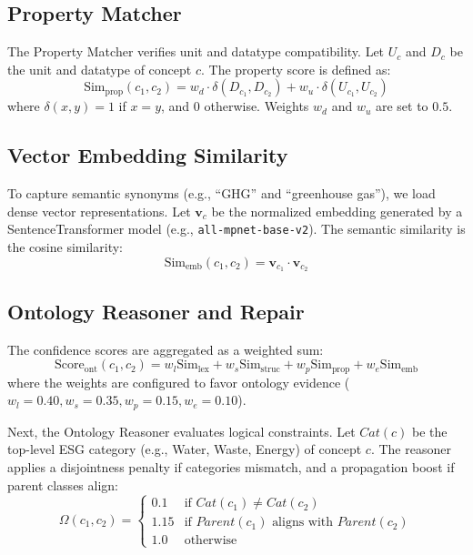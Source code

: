 \documentclass[journal,compsoc]{IEEEtran}
\begin{document}
\begin{itemize}
\subsection{Property Matcher}
The Property Matcher verifies unit and datatype compatibility. Let $U_c$ and $D_c$ be the unit and datatype of concept $c$. The property score is defined as:
\begin{equation}
\text{Sim}_{\text{prop}}(c_1, c_2) = w_d \cdot \delta(D_{c_1}, D_{c_2}) + w_u \cdot \delta(U_{c_1}, U_{c_2})
\end{equation}
where $\delta(x, y) = 1$ if $x = y$, and $0$ otherwise. Weights $w_d$ and $w_u$ are set to $0.5$.

\subsection{Vector Embedding Similarity}
To capture semantic synonyms (e.g., ``GHG'' and ``greenhouse gas''), we load dense vector representations. Let $\mathbf{v}_{c}$ be the normalized embedding generated by a SentenceTransformer model (e.g., \texttt{all-mpnet-base-v2}). The semantic similarity is the cosine similarity:
\begin{equation}
\text{Sim}_{\text{emb}}(c_1, c_2) = \mathbf{v}_{c_1} \cdot \mathbf{v}_{c_2}
\end{equation}

\subsection{Ontology Reasoner and Repair}
The confidence scores are aggregated as a weighted sum:
\begin{equation}
\text{Score}_{\text{ont}}(c_1, c_2) = w_{l}\text{Sim}_{\text{lex}} + w_{s}\text{Sim}_{\text{struc}} + w_{p}\text{Sim}_{\text{prop}} + w_{e}\text{Sim}_{\text{emb}}
\label{eq:weighted}
\end{equation}
where the weights are configured to favor ontology evidence ($w_l = 0.40, w_s = 0.35, w_p = 0.15, w_e = 0.10$).

Next, the Ontology Reasoner evaluates logical constraints. Let $Cat(c)$ be the top-level ESG category (e.g., Water, Waste, Energy) of concept $c$. The reasoner applies a disjointness penalty if categories mismatch, and a propagation boost if parent classes align:
\begin{equation}
\Omega(c_1, c_2) = 
\begin{cases} 
0.1 & \text{if } Cat(c_1) \neq Cat(c_2) \\
1.15 & \text{if } Parent(c_1) \text{ aligns with } Parent(c_2) \\
1.0 & \text{otherwise}
\end{cases}
\end{equation}


\end{itemize}
\end{document}
